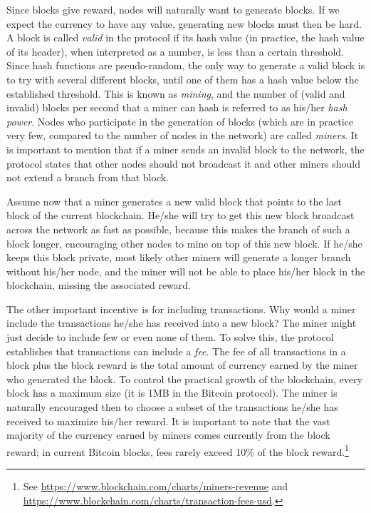Since blocks give reward, nodes will naturally want to generate blocks. If we expect the currency to have any value, generating new blocks must then be hard. A block is called \emph{valid} in the protocol if its hash value (in practice, the hash value of its header), when interpreted as a number, is less than a certain threshold. Since hash functions are pseudo-random, the only way to generate a valid block is to try with several different blocks, until one of them has a hash value below the established threshold. This is known as \emph{mining}, and the number of (valid and invalid) blocks per second that a miner can hash is referred to as his/her \emph{hash power}. Nodes who participate in the generation of blocks (which are in practice very few, compared to the number of nodes in the network) are called \emph{miners}. It is important to mention that if a miner sends an invalid block to the network, the protocol states that other nodes should not broadcast it and other miners should not extend a branch from that block. 

Assume now that a miner generates a new valid block that points to the last block of the current blockchain. He/she will try to get this new block broadcast across the network as fast as possible, because this makes the branch of such a block longer, encouraging other nodes to mine on top of this new block. If he/she keeps this block private, most likely other miners will generate a longer branch without his/her node, and the miner will not be able to place his/her block in the blockchain, missing the associated reward.

The other important incentive is for including transactions. Why would a miner include the transactions he/she has received into a new block? The miner might just decide to include few or even none of them. To solve this, the protocol establishes that transactions can include a \emph{fee}. The fee of all transactions in a block plus the block reward is the total amount of currency earned by the miner who generated the block. To control the practical growth of the blockchain, every block has a maximum size (it is 1MB in the Bitcoin protocol). The miner is naturally encouraged then to choose a subset of the transactions he/she has received to maximize his/her reward. It is important to note that the vast majority of the currency earned by miners comes currently from the block reward; in current Bitcoin blocks, fees rarely exceed 10\% of the block reward.\footnote{See  \url{https://www.blockchain.com/charts/miners-revenue} and \url{https://www.blockchain.com/charts/transaction-fees-usd}.}


